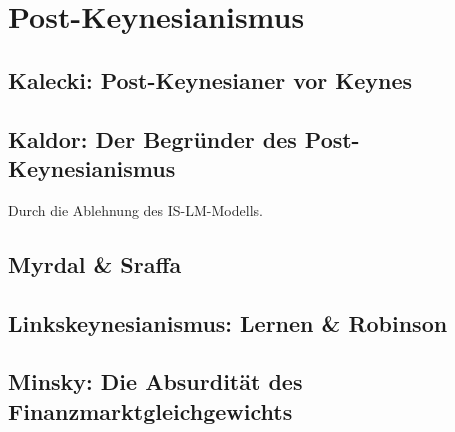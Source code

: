 %
%
%

\chapter{Post-Keynesianismus}
\label{Post-Keynes}


\section{Kalecki: Post-Keynesianer vor Keynes}

\section{Kaldor: Der Begründer des Post-Keynesianismus}
Durch die Ablehnung des IS-LM-Modells.

\section{Myrdal \& Sraffa}

\section{Linkskeynesianismus: Lernen \& Robinson}

\section{Minsky: Die Absurdität des Finanzmarktgleichgewichts}

